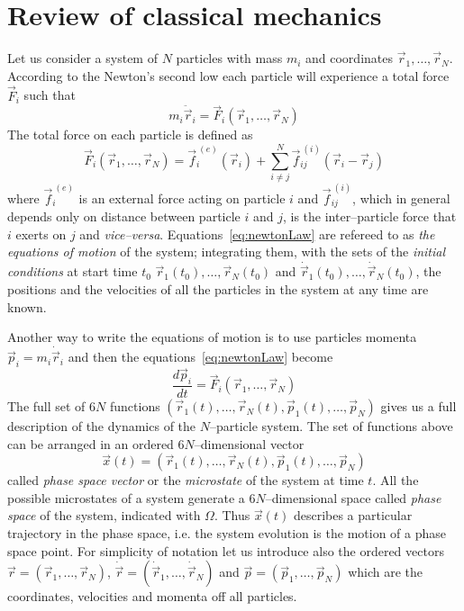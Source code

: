 \section{Review of classical mechanics}
Let us consider a system of $N$ particles with mass $m_i$ and coordinates $\vec r_1,\dots,\vec r_N$. According
to the Newton's second low each particle will experience a total force $\vec F_i$ such that
\begin{equation}
	m_i \ddot{\vec{r}}_i = \vec F_i(\vec r_1,\dots,\vec r_N)
	\label{eq:newtonLaw}
\end{equation}
The total force on each particle is defined as
\begin{equation*}
	\vec F_i(\vec r_1,\dots,\vec r_N) = \vec{f}_i^{\ (e)}(\vec r_i) + \sum_{i\ne j}^N \vec{f}_{ij}^{\ (i)}(\vec r_i - \vec r_j )
\end{equation*}
where $\vec{f}_i^{\ (e)}$ is an external force acting on particle $i$ and $\vec{f}_{ij}^{\ (i)}$, which in general
depends only on distance between particle $i$ and $j$, is the inter--particle force that $i$ exerts on $j$ and
\textit{vice--versa}. Equations~\eqref{eq:newtonLaw} are refereed to as \textit{the equations of motion} of the
system; integrating them, with the sets of the \textit{initial conditions} at start time
$t_0$ $\vec r_1(t_0),\dots,\vec r_N(t_0)$ and $\dot{\vec{r}}_1(t_0),\dots,\dot{\vec{r}}_N(t_0)$, the positions
and the velocities of all the particles in the system at any time are known.

Another way to write the equations of motion is to use particles momenta $\vec p_i = m_i \dot{\vec{r}}_i$ and then
the equations~\eqref{eq:newtonLaw} become
\begin{equation}
	\frac{d\vec p_i}{dt} = \vec F_i(\vec r_1,\dots,\vec r_N)
	\label{eq:newtonLawMom}
\end{equation}
The full set of $6N$ functions $(\vec r_1(t),\dots,\vec r_N(t),\vec p_1(t),\dots,\vec p_N)$ gives us a full
description of the dynamics of the $N$--particle system. The set of functions above can be arranged in an ordered
$6N$--dimensional vector
\begin{equation}
	\vec x(t) = (\vec r_1(t),\dots,\vec r_N(t),\vec p_1(t),\dots,\vec p_N)
	\label{eq:phSpaceVector}
\end{equation}
called \textit{phase space vector} or the \textit{microstate} of the system at time $t$. All the possible
microstates of a system generate a $6N$--dimensional space called \textit{phase space} of the system, indicated
with $\Omega$. Thus $\vec x(t)$ describes a particular trajectory in the phase space, i.e. the system evolution
is the motion of a phase space point. For simplicity of notation let us introduce also the ordered vectors
$\vec r = (\vec r_1, \dots, \vec r_N)$, $\dot{\vec r} = (\dot{\vec{r}}_1,\dots,\dot{\vec{r}}_N)$ and
$\vec p = (\vec p_1, \dots, \vec p_N)$ which are the coordinates, velocities and momenta off all particles.

